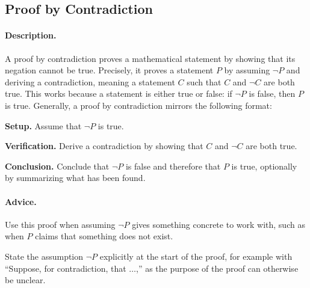 \subsection{Proof by Contradiction}
\label{subsections:techniques:universal:contradiction}



\paragraph{Description.}
A proof by contradiction proves a mathematical statement by showing that %
its negation cannot be true. %
Precisely, it proves a statement $P$ by assuming $\neg P$ and deriving a %
contradiction, meaning a statement $C$ such that $C$ and $\neg C$ are %
both true. %
This works because a statement is either true or false: %
if $\neg P$ is false, then $P$ is true. %
Generally, a proof by contradiction mirrors the following format:
\begin{enumerate}{
    \item \textbf{Setup.} %
        Assume that $\neg P$ is true.
    \item \textbf{Verification.} %
        Derive a contradiction by showing that $C$ and $\neg C$ are both %
        true.
    \item \textbf{Conclusion.} %
        Conclude that $\neg P$ is false and therefore that $P$ is true, %
        optionally by summarizing what has been found.
}
\end{enumerate}



\paragraph{Advice.}
\begin{itemize}{
    \item Use this proof when assuming $\neg P$ gives something concrete %
        to work with, such as when $P$ claims that something does not exist.
    \item State the assumption $\neg P$ explicitly at the start of the %
        proof, for example with ``Suppose, for contradiction, that $\dots$,'' %
        as the purpose of the proof can otherwise be unclear.
}
\end{itemize}



